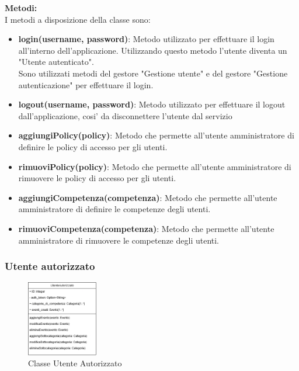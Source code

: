\documentclass{article}
\begin{document}
\textbf{Metodi:}\\
I metodi a disposizione della classe sono:

\begin{itemize}
    \item \textbf{login(username, password)}: Metodo utilizzato per effettuare il login all'interno dell'applicazione. Utilizzando questo metodo l'utente diventa un "Utente autenticato".\\Sono utilizzati metodi del gestore "Gestione utente" e del gestore "Gestione autenticazione" per effettuare il login.
    \item \textbf{logout(username, password)}: Metodo utilizzato per effettuare il logout dall'applicazione, cosi' da disconnettere l'utente dal servizio
    \item \textbf{aggiungiPolicy(policy)}: Metodo che permette all'utente amministratore di definire le policy di accesso per gli utenti.
    \item \textbf{rimuoviPolicy(policy)}: Metodo che permette all'utente amministratore di rimuovere le policy di accesso per gli utenti.
    \item \textbf{aggiungiCompetenza(competenza)}: Metodo che permette all'utente amministratore di definire le competenze degli utenti.
    \item \textbf{rimuoviCompetenza(competenza)}: Metodo che permette all'utente amministratore di rimuovere le competenze degli utenti.
\end{itemize}

\clearpage

\subsubsection{Utente autorizzato}

\begin{figure}[htbp]
    \centering
    \includegraphics[width=0.275\textwidth]{Images/utenteAutorizzato_class.png}
    \caption{Classe Utente Autorizzato}
    \label{fig:utente_autorizzato}
\end{figure}
\end{document}
